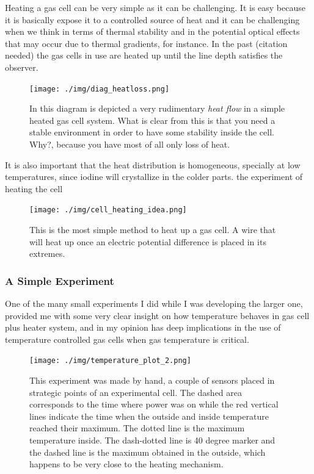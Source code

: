 \documentclass[master,       %
               twoside,        %
               BCOR10mm,       %
               ngerman,english  %
               ]{GAUBM_astro}
\begin{document}
Heating a gas cell can be very simple as it can be challenging. It is 
easy because it is basically expose it to a controlled source of heat and it can
be challenging when we think in terms of thermal stability and in the 
potential optical effects that may occur due to thermal gradients, for instance.
In the past (citation needed) the gas cells in use are heated up until the 
line depth satisfies the observer. 
\begin{center}
 \begin{figure}[h!]
 \centering
 \texttt{[image: ./img/diag\_heatloss.png]}
 \caption{In this diagram is depicted a very rudimentary \emph{heat flow} in a simple heated gas cell system. What is clear from this is that you need
 a stable environment in order to have some stability inside the cell. Why?, because you have most of all only loss of heat.}
 \label{fig:diag_heatloss}
\end{figure}
\end{center}

It is also important that the heat distribution is homogeneous, specially at low temperatures, since iodine will crystallize in the colder parts.
the experiment of heating the cell
\begin{figure}[h!]
\centering
\texttt{[image: ./img/cell\_heating\_idea.png]}
\caption{This is the most simple method to heat up a gas cell. A wire that will heat up once an electric potential difference is placed in its extremes.}
\label{fig:cell_heating_idea}
\end{figure}
\subsubsection{A Simple Experiment}
One of the many small experiments I did while I was developing the larger one, provided me with some very clear insight on how temperature behaves in
gas cell plus heater system, and in my opinion has deep implications in the use of temperature controlled gas cells when gas temperature is critical.


\begin{figure}[h!]
 \centering
 \texttt{[image: ./img/temperature\_plot\_2.png]}
 \caption{This experiment was made by hand, a couple of sensors placed in strategic points of an experimental cell. The dashed area corresponds to the time where power was on while
 the red vertical lines indicate the time when the outside and inside temperature reached their maximum. The dotted line is the maximum temperature inside. The dash-dotted line
 is 40 degree marker and the dashed line is the maximum obtained in the outside, which happens to be very close to the heating mechanism.}
 \label{fig:temp-plot}
\end{figure}
\end{document}

